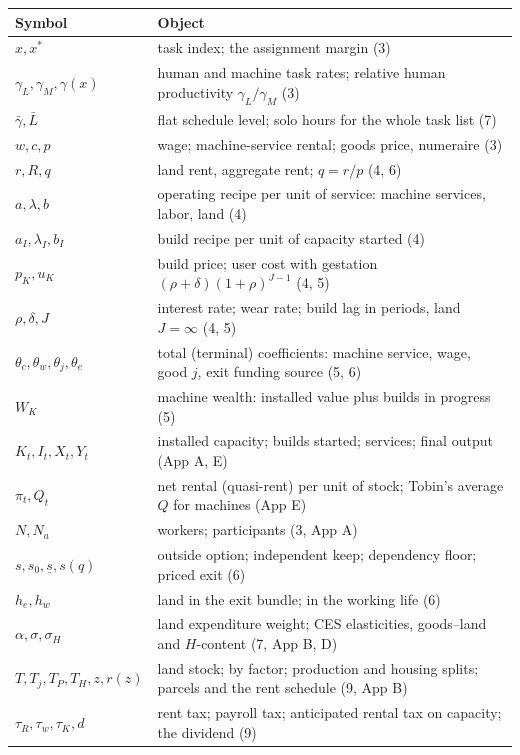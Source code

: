 \documentclass[12pt]{article}
\theoremstyle{plain}
\begin{document}
\begin{center}
{\small
\begin{tabular}{l p{9.6cm}}
\toprule
Symbol & Object \\
\midrule
$x, x^*$ & task index; the assignment margin (3) \\
$\gamma _L, \gamma _M, \gamma (x)$ & human and machine task rates; relative human productivity $\gamma _L/\gamma _M$ (3) \\
$\bar{\gamma}, \bar{L}$ & flat schedule level; solo hours for the whole task list (7) \\
$w, c, p$ & wage; machine-service rental; goods price, numeraire (3) \\
$r, R, q$ & land rent, aggregate rent; $q = r/p$ (4, 6) \\
$a, \lambda , b$ & operating recipe per unit of service: machine services, labor, land (4) \\
$a_I, \lambda _I, b_I$ & build recipe per unit of capacity started (4) \\
$p_K, u_K$ & build price; user cost with gestation $(\rho +\delta )(1+\rho )^{J-1}$ (4, 5) \\
$\rho , \delta , J$ & interest rate; wear rate; build lag in periods, land $J = \infty$ (4, 5) \\
$\theta _c, \theta _w, \theta _j, \theta _e$ & total (terminal) coefficients: machine service, wage, good $j$, exit funding source (5, 6) \\
$W_K$ & machine wealth: installed value plus builds in progress (5) \\
$K_t, I_t, X_t, Y_t$ & installed capacity; builds started; services; final output (App A, E) \\
$\pi _t, Q_t$ & net rental (quasi-rent) per unit of stock; Tobin's average $Q$ for machines (App E) \\
$N, N_a$ & workers; participants (3, App A) \\
$s, s_0, \underline{s}, s(q)$ & outside option; independent keep; dependency floor; priced exit (6) \\
$h_e, h_w$ & land in the exit bundle; in the working life (6) \\
$\alpha , \sigma , \sigma _H$ & land expenditure weight; CES elasticities, goods--land and $H$-content (7, App B, D) \\
$T, T_j, T_P, T_H, z, r(z)$ & land stock; by factor; production and housing splits; parcels and the rent schedule (9, App B) \\
$\tau _R, \tau _w, \tau _K, d$ & rent tax; payroll tax; anticipated rental tax on capacity; the dividend (9) \\

\end{tabular}}
\end{center}
\end{document}
